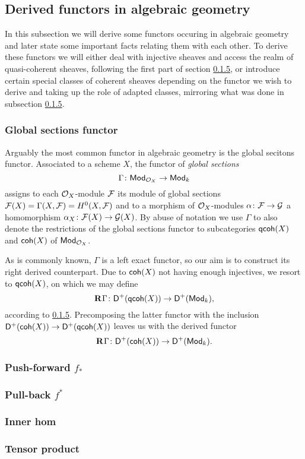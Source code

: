 \subsection{Derived functors in algebraic geometry}

In this subsection we will derive some functors occuring in algebraic geometry and later state some important facts relating them with each other. To derive these functors we will either deal with injective sheaves and access the realm of quasi-coherent sheaves, following the first part of section \ref{}, or introduce certain special classes of coherent sheaves depending on the functor we wish to derive and taking up the role of adapted classes, mirroring what was done in subsection \ref{}.

\subsubsection{Global sections functor}
Arguably the most common functor in algebraic geometry is the global secitons functor. Associated to a scheme $X$, the functor of \emph{global sections}
\[
    \Gamma \colon \mathsf{Mod}_{\mathcal O_X} \to \mathsf{Mod}_{k}
\]
assigns to each $\mathcal O_X$-module $\mathcal F$ its module of global sections $\mathcal F(X) = \Gamma(X, \mathcal F) = H^0(X, \mathcal F)$ and to a morphism of $\mathcal O_X$-modules $\alpha\colon \mathcal F \to \mathcal G$ a homomorphism $\alpha_X \colon \mathcal F(X) \to \mathcal G(X)$.
By abuse of notation we use $\Gamma$ to also denote the restrictions of the global sections functor to subcategories $\mathsf{qcoh}(X)$ and $\mathsf{coh}(X)$ of $\mathsf{Mod}_{\mathcal O_X}$.

As is commonly known, $\Gamma$ is a left exact functor, so our aim is to construct its right derived counterpart. Due to $\mathsf{coh}(X)$ not having enough injectives, we resort to $\mathsf{qcoh}(X)$, on which we may define 
\[
    \mathbf{R}^{}\Gamma\colon \mathsf{D}^+(\mathsf{qcoh}(X)) \to \mathsf{D}^+(\mathsf{Mod}_{k}),
\]
according to \ref{}. Precomposing the latter functor with the inclusion $\mathsf{D}^+(\mathsf{coh}(X)) \to \mathsf{D}^+(\mathsf{qcoh}(X))$ leaves us with the derived functor
\[
    \mathbf{R}^{}\Gamma \colon \mathsf{D}^+(\mathsf{coh}(X)) \to \mathsf{D}^+(\mathsf{Mod}_{k}).
\]







\subsubsection{Push-forward $f_*$}
\subsubsection{Pull-back $f^*$}
\subsubsection{Inner hom}
\subsubsection{Tensor product }
